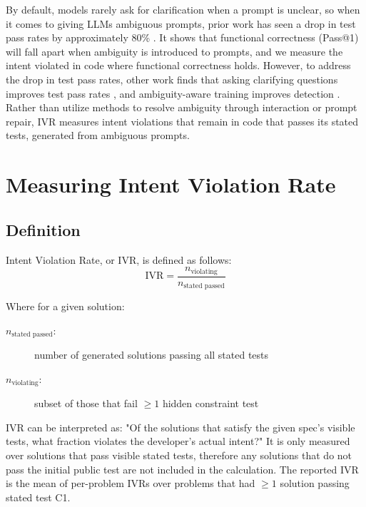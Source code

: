 \documentclass[11pt]{article}
\begin{document}
By default, models rarely ask for clarification when a prompt is unclear, so when it comes to giving LLMs ambiguous prompts, prior work has seen a drop in test pass rates by approximately 80\% \citep{li2026clareval}. It shows that functional correctness (Pass@1) will fall apart when ambiguity is introduced to prompts, and we measure the intent violated in code where functional correctness holds. However, to address the drop in test pass rates, other work finds that asking clarifying questions improves test pass rates \citep{mu2023clarifygpt}, and ambiguity-aware training improves detection \citep{kim2024aligning}. Rather than utilize methods to resolve ambiguity through interaction or prompt repair, IVR measures intent violations that remain in code that passes its stated tests, generated from ambiguous prompts. 

\section{Measuring Intent Violation Rate}

\subsection{Definition}
Intent Violation Rate, or IVR, is defined as follows: 
\begin{equation}
  \mathrm{IVR} = \frac{n_{\text{violating}}}{n_{\text{stated passed}}}
\end{equation}

Where for a given solution:
\begin{description}
  \item[$n_{\text{stated passed}}$:] number of generated solutions passing all stated tests
  \item[$n_{\text{violating}}$:] subset of those that fail $\geq 1$ hidden constraint test
\end{description}

IVR can be interpreted as: "Of the solutions that satisfy the given spec's visible tests, what fraction violates the developer's actual intent?" It is only measured over solutions that pass visible stated tests, therefore any solutions that do not pass the initial public test are not included in the calculation. The reported IVR is the mean of per-problem IVRs over problems that had $\geq 1$ solution passing stated test C1. 
\end{document}
